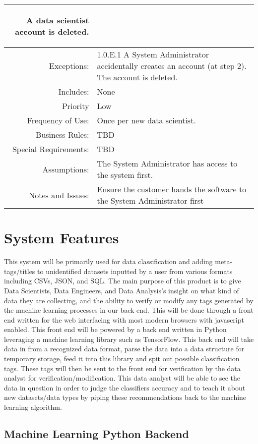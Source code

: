 \documentclass[12pt,oneside,letterpaper]{article}
\newenvironment{packed_enumerate}{ %
\vspace{-7mm}
\begin{enumerate}
  \setlength{\itemsep}{0pt}
  \setlength{\parskip}{0pt}
  \setlength{\parsep}{0pt}
}{\end{enumerate}
\vspace{-8mm}}
\begin{document}
\begin{longtable}{|r|p{3.8in}|}
\begin{packed_enumerate}
\item A data scientist account is deleted.
\end{packed_enumerate}\\
\hline
Exceptions:&1.0.E.1 A System Administrator accidentally creates an account (at step 2).\newline
The account is deleted.\\
\hline
Includes:&None\\
\hline
Priority&Low\\
\hline
Frequency of Use:&Once per new data scientist.\\
\hline
Business Rules:&TBD\\
\hline
Special Requirements:&TBD\\
\hline
Assumptions:&The System Administrator has access to the system first.\\
\hline
Notes and Issues:&Ensure the customer hands the software to the System Administrator first\\
\hline
\end{longtable}


\section{System Features}
This system will be primarily used for data classification and adding meta-tags/titles to unidentified datasets inputted by a user from various formats including CSVs, JSON, and SQL. The main purpose of this product is to give Data Scientists, Data Engineers, and Data Analysis's insight on what kind of data they are collecting, and the ability to verify or modify any tags generated by the machine learning processes in our \gls{back end}. This will be done through a \gls{front end} written for the web interfacing with most modern browsers with javascript enabled. This \gls{front end} will be powered by a \gls{back end} written in Python leveraging a machine learning library such as TensorFlow. This \gls{back end} will take data in from a recognized data format, parse the data into a data structure for temporary storage, feed it into this library and spit out possible classification tags. These tags will then be sent to the \gls{front end} for verification by the data analyst for verification/modification. This data analyst will be able to see the data in question in order to judge the classifiers accuracy and to teach it about new datasets/data types by piping these recommendations back to the machine learning algorithm.

  \subsection{Machine Learning Python Backend}
\end{document}
